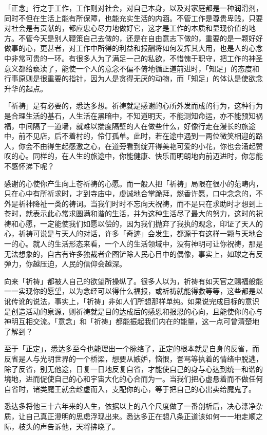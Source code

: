 \documentclass[12pt,twoside,openany]{book}
\begin{document}
「正念」行之于工作，工作则对社会，对自己本身，以及对家庭都是一种润滑剂，同时不但在生活上能有所保障，也能充实生活的内涵。不管工作是尊贵卑贱，只要对社会是有贡献的，都应忠心尽力地做好它，这才是工作的本质和显现价值的地方。不管今天是别人鞭策自己去做的，还是在自由意志下做的，重要的是一颗好好做事的心，更甚者，对工作中所得的利益和报酬将如何发挥其大用，也是人的心念中非常可贵的一环。有很多人为了满足一己的私欲，不惜愧于职守，把工作的神圣意义都给亵渎了，能使一个人的意念不偏不倚地循正道前进时，「知足」的态度和行事原则是很重要的指针，因为人是贪得无厌的动物，而「知足」的体认是使欲念升华的起点。

「祈祷」是有必要的，悉达多想。祈祷就是感谢的心所外发而成的行为，这种行为是合理生活的基石，人生活在黑暗中，不知道明天，不能测知命运，亦不能预知祸福，中间隔了一道墙，就难以揣度隔壁的人在做些什么，好像行走在漫长的旅途中，前不见店，后不着村的，伶仃孤单。此时，若在途中遇到一两位微笑相迎的路人，你会不由得生起感激之心，在道旁看到绽开得美艳可爱的小花，你也会涌起赞叹的心。同样的，在人生的旅途中，你能健康、快乐而明朗地向前迈进时，你怎能不感怀涕下呢？

感谢的心使你产生向上苍祈祷的心愿。而一般人把「祈祷」局限在很小的范畴内，只在心中有所祈求时，才到寺庙中，虔诚地合掌跪拜，燃香许愿，口中念念的，不外是祈神降祉一类的祷词。当我们时时不忘向天祝祷，而不是只在求助时才想到上苍时，就表示此心常求圆满和谐的生活，并为这种生活尽了最大的努力，这时的祝祷和心愿，一定能使我们如愿以偿的，因为我们抛弃了我执的观念，印证了天人的心，祈祷可说是与天人的对话，许多「奇迹」会发生，都源于有这样一颗与天地合一的心。就人的生活形态来看，一个人的生活领域中，没有神明可让你祝祷，那是无法想象的，自古有许多独裁者企图铲除人民心目中的偶像，事实上，如球之有反弹力，你越压迫，人民的信仰会越深。

向来「祈祷」都被人自己的欲望所操纵了。很多人以为，祈祷有如天官之赐福般能一一实现你的愿望，以为念经可以得什么福报，或祈祷就能得救等等，这些都是以讹传讹的说法，事实上，「祈祷」非如人们所想那样单纯。如果说完成目标的意识是创造活动的泉源，则祈祷就是目的达成后的感恩和报恩的心向，且能使你的心与神明互相交流。「意念」和「祈祷」都能振起我们内在的能量，这一点可曾清楚地了解到？

至于「正定」，悉达多至今也能理出一个脉络了，正定的根本就是自身的反省，而反省是人与光明世界的一个桥梁，想要从嫉妒，恼恨，詈骂等执着的情绪中脱逃，除了反省，别无他途，日复一日地反复自省，才能使自己的身与心达到统一和谐的境地，进而促使自己的心和宇宙大化的心合而为一。当我们把心虚悬着而不做任何自省时，诸类魔王就会趁虚而入，支配你的心，等于把自己的心出卖给魔鬼了。

悉达多将他三十六年来的人生，依据以上的八个尺度做了一番剖析后，决心涤净杂质，让自己真正澄明的思虑浮现出来。悉达多正在想八条正道该如何一一地走顺之际，枝头的声告诉他，天将拂晓了。
\end{document}
